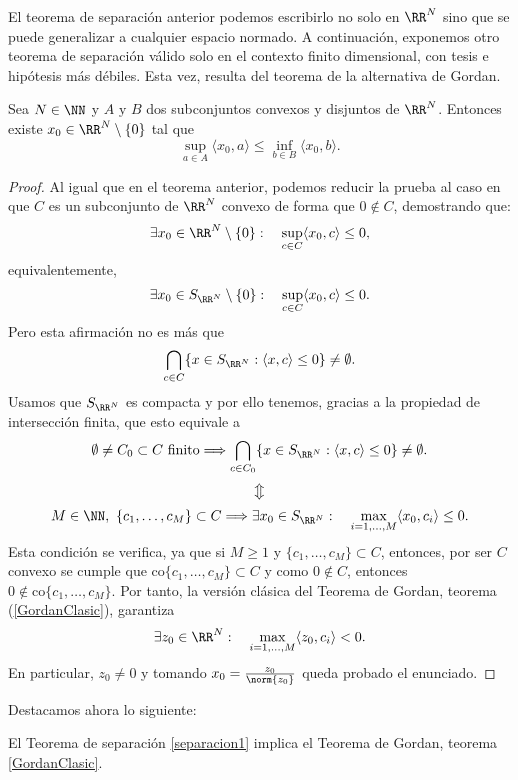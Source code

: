 El teorema de separación anterior podemos escribirlo no solo en $ \RR^N $ sino que se puede generalizar a cualquier espacio normado. A continuación, exponemos otro teorema de separación válido solo en el contexto finito dimensional, con tesis e hipótesis más débiles. Esta vez, resulta del teorema de la alternativa de Gordan.
\bigskip

\begin{teoremaBox}\label{sepDébil}
Sea $ N \in \NN $ y $ A \text{ y } B$ dos subconjuntos convexos y disjuntos de $ \RR^N $. Entonces existe $ x_0 \in \RR^N \setminus \{0\} $ tal que
\[
\sup_{a \in A} \langle x_0,a\rangle \leq \inf_{b\in B} \langle x_0,b\rangle.
\]
\end{teoremaBox}
\begin{proof}
Al igual que en el teorema anterior, podemos reducir la prueba al caso en que $ C $ es un subconjunto de $ \RR^N $ convexo de forma que $ 0 \notin C $, demostrando que:
\[
\exists x_0 \in \RR^N \setminus \{0\}: \quad \sup_{c \in C} \langle x_0, c \rangle \leq 0,
\]
equivalentemente, 
\[
\exists x_0 \in S_{\RR^N} \setminus \{0\}: \quad \sup_{c \in C} \langle x_0, c \rangle \leq 0.
\]
Pero esta afirmación no es más que
\[
\bigcap_{c \in C} \{x \in S_{\RR^N}: \langle x, c \rangle \leq 0 \} \neq \emptyset.
\]
Usamos que $ S_{\RR^N} $ es compacta y por ello tenemos, gracias a la propiedad de intersección finita, que esto equivale a
\[
\emptyset \neq C_0 \subset C \text{ finito} \Longrightarrow \bigcap_{c \in C_0} \{x \in S_{\RR^N}: \langle x, c \rangle \leq 0 \} \neq \emptyset.
\]
\[
\big\Updownarrow
\]
\[
M \in \NN, \text{ } \{c_1,\dots, c_M\} \subset C\Longrightarrow \exists x_0 \in S_{\RR^N}: \quad \max_{i=1,\dots,M} \langle x_0, c_i \rangle \leq 0.
\]
Esta condición se verifica, ya que si $ M \geq 1 $ y $ \{c_1,\dots, c_M\} \subset C $, entonces, por ser $ C $ convexo se cumple que $ \mathrm{co}\{c_1,\dots, c_M \} \subset C $ y como $ 0 \notin C $, entonces $  0 \notin \mathrm{co}\{c_1,\dots, c_M \} $. Por tanto, la versión clásica del Teorema de Gordan, teorema (\ref{GordanClasic}), garantiza
\[
\exists z_0 \in \RR^N: \quad \max_{i=1,\dots,M} \langle z_0, c_i \rangle < 0.
\]
En particular, $ z_0 \neq 0 $ y tomando $ x_0 = \frac{z_0}{\norm{z_0}} $ queda probado el enunciado.
\end{proof}
\bigskip

Destacamos ahora lo siguiente:
\bigskip
\begin{observacion}
El Teorema de separación \ref{separacion1} implica el Teorema de Gordan, teorema \ref{GordanClasic}.
\end{observacion}

